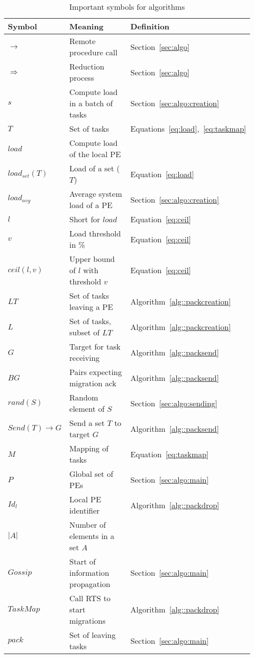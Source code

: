 \begin{table}
	\begin{tabular}{l | l | l }
		Symbol & Meaning & Definition\\ \hline
		$\rightarrow$ 	& Remote procedure call &  Section~\ref{sec:algo} \\
		$\Rightarrow$ 	& Reduction process & Section~\ref{sec:algo} \\
		$s$			  	& Compute load in a batch of tasks & Section~\ref{sec:algo:creation} \\
		$T$				& Set of tasks 										& Equations~\ref{eq:load},~\ref{eq:taskmap} \\
		$load$			& Compute load of the local PE \\
		$load_{set}(T)$	& Load of a set ($T$) 								& Equation~\ref{eq:load} \\
		$load_{avg}$	& Average system load of a PE 						& Section~\ref{sec:algo:creation}\\
		$l$				& Short for $load$ 									& Equation~\ref{eq:ceil} \\
		$v$				& Load threshold in \% 								& Equation~\ref{eq:ceil} \\
		$ceil(l,v)$		& Upper bound of $l$ with threshold $v$		 		& Equation~\ref{eq:ceil} \\ 
		$LT$			& Set of tasks leaving a PE 						& Algorithm~\ref{alg::packcreation} \\
		$L$				& Set of tasks, subset of $LT$						& Algorithm~\ref{alg::packcreation} \\
		$G$				& Target for task receiving							& Algorithm~\ref{alg::packsend} \\
		$BG$			& Pairs expecting migration ack						& Algorithm~\ref{alg::packsend} \\ 
		$rand(S)$		& Random element of $S$ 							& Section~\ref{sec:algo:sending} \\
		$Send(T)\rightarrow G $ & Send a set $T$ to target $G$				& Algorithm~\ref{alg::packsend} \\ 
		$M$				& Mapping of tasks									& Equation~\ref{eq:taskmap} \\
		$P$				& Global set of PEs 								& Section~\ref{sec:algo:main} \\
		$Id_l$ 			& Local PE identifier								& Algorithm~\ref{alg::packdrop} \\
		$|A|$			& Number of elements in a set $A$	\\
		$Gossip$		& Start of information propagation					& Section~\ref{sec:algo:main} \\
		$TaskMap$		& Call RTS to start migrations						& Algorithm~\ref{alg::packdrop} \\
		$pack$			& Set of leaving tasks								& Section~\ref{sec:algo:main} \\
	\end{tabular}
	\caption{Important symbols for algorithms}
	\label{tab:algo:symbols}
\end{table}

